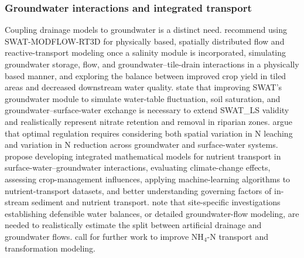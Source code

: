 \documentclass[11pt]{article}
\begin{document}
\subsubsection{Groundwater interactions and integrated transport}
Coupling drainage models to groundwater is a distinct need. \textcite{Addab2022} recommend using SWAT-MODFLOW-RT3D for physically based, spatially distributed flow and reactive-transport modeling once a salinity module is incorporated, simulating groundwater storage, flow, and groundwater--tile-drain interactions in a physically based manner, and exploring the balance between improved crop yield in tiled areas and decreased downstream water quality. \textcite{Hoang2017} state that improving SWAT's groundwater module to simulate water-table fluctuation, soil saturation, and groundwater--surface-water exchange is necessary to extend SWAT\_LS validity and realistically represent nitrate retention and removal in riparian zones. \textcite{Hojberg2017} argue that optimal regulation requires considering both spatial variation in N leaching and variation in N reduction across groundwater and surface-water systems. \textcite{Elsayed2023} propose developing integrated mathematical models for nutrient transport in surface-water--groundwater interactions, evaluating climate-change effects, assessing crop-management influences, applying machine-learning algorithms to nutrient-transport datasets, and better understanding governing factors of in-stream sediment and nutrient transport. \textcite{Barkle2021} note that site-specific investigations establishing defensible water balances, or detailed groundwater-flow modeling, are needed to realistically estimate the split between artificial drainage and groundwater flows. \textcite{Yang2008} call for further work to improve NH$_4$-N transport and transformation modeling.
\end{document}
